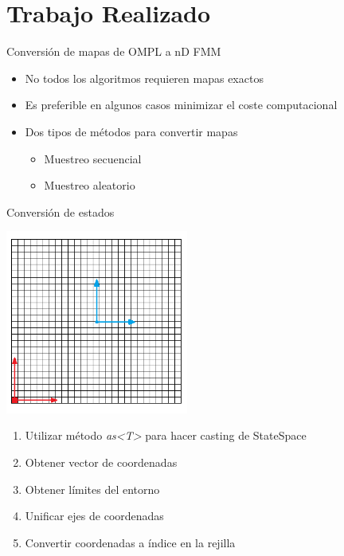 \documentclass[10pt]{beamer}
\begin{document}
\section{Trabajo Realizado}

\begin{frame}{Conversión de mapas de OMPL a nD FMM}
	\begin{itemize}
		\item No todos los algoritmos requieren mapas exactos
		\item Es preferible en algunos casos minimizar el coste computacional
		
		\vspace{0.5cm}
		\item Dos tipos de métodos para convertir mapas
			\begin{itemize}
				\item Muestreo secuencial
				\item Muestreo aleatorio
			\end{itemize}
		
	\end{itemize}
\end{frame}


\begin{frame}{Conversión de estados}
	\begin{multicols}{2}
		\includegraphics[width=0.45\textwidth,keepaspectratio]{ejes}	
		\begin{enumerate}
			\item Utilizar método \textit{as<T>} para hacer casting de StateSpace
			\item Obtener vector de coordenadas
			\item Obtener límites del entorno
			\item Unificar ejes de coordenadas
			\item Convertir coordenadas a índice en la rejilla
		\end{enumerate}
	\end{multicols}
\end{frame}
\end{document}
